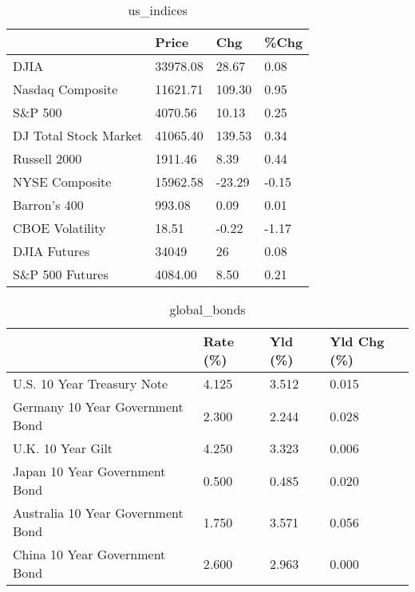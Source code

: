 \documentclass{article}%
\begin{document}
%


\begin{table}[htbp]%
\caption{us\_indices}%
\centering%
\begin{adjustbox}{width=1\textwidth}%
\begin{tabular}{llll}
\toprule
                      &    Price &    Chg &  \%Chg \\
\midrule
                 DJIA & 33978.08 &  28.67 &  0.08 \\
     Nasdaq Composite & 11621.71 & 109.30 &  0.95 \\
              S\&P 500 &  4070.56 &  10.13 &  0.25 \\
DJ Total Stock Market & 41065.40 & 139.53 &  0.34 \\
         Russell 2000 &  1911.46 &   8.39 &  0.44 \\
       NYSE Composite & 15962.58 & -23.29 & -0.15 \\
         Barron's 400 &   993.08 &   0.09 &  0.01 \\
      CBOE Volatility &    18.51 &  -0.22 & -1.17 \\
         DJIA Futures &    34049 &     26 &  0.08 \\
      S\&P 500 Futures &  4084.00 &   8.50 &  0.21 \\
\bottomrule
\end{tabular}
%
\end{adjustbox}%
\end{table}

%


\begin{table}[htbp]%
\caption{global\_bonds}%
\centering%
\begin{adjustbox}{width=1\textwidth}%
\begin{tabular}{llll}
\toprule
                                  & Rate (\%) & Yld (\%) & Yld Chg (\%) \\
\midrule
       U.S. 10 Year Treasury Note &    4.125 &   3.512 &       0.015 \\
  Germany 10 Year Government Bond &    2.300 &   2.244 &       0.028 \\
                U.K. 10 Year Gilt &    4.250 &   3.323 &       0.006 \\
    Japan 10 Year Government Bond &    0.500 &   0.485 &       0.020 \\
Australia 10 Year Government Bond &    1.750 &   3.571 &       0.056 \\
    China 10 Year Government Bond &    2.600 &   2.963 &       0.000 \\
\bottomrule
\end{tabular}
%
\end{adjustbox}%
\end{table}
\end{document}
